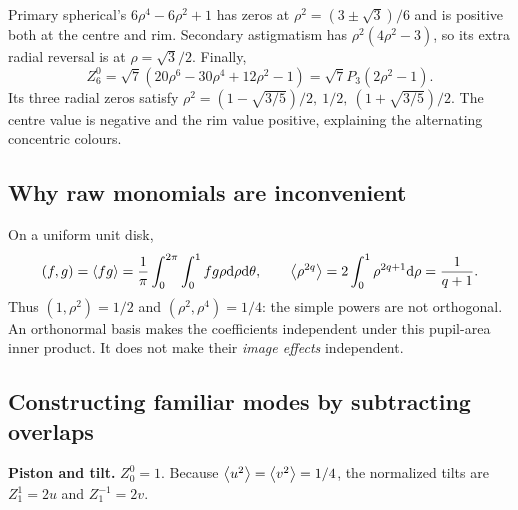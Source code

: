 Primary spherical's $6\rho^4-6\rho^2+1$ has zeros at
$\rho^2=(3\pm\sqrt3)/6$ and is positive both at the centre and rim. Secondary astigmatism has $\rho^2(4\rho^2-3)$, so its extra radial reversal is at $\rho=\sqrt3/2$. Finally,
\begin{equation}
Z_6^0=\sqrt7(20\rho^6-30\rho^4+12\rho^2-1)
=\sqrt7P_3(2\rho^2-1).
\end{equation}
Its three radial zeros satisfy $\rho^2=(1-\sqrt{3/5})/2,\ 1/2,\ (1+\sqrt{3/5})/2$. The centre value is negative and the rim value positive, explaining the alternating concentric colours.

\subsection{Why raw monomials are inconvenient}
On a uniform unit disk,
\begin{equation}
(f,g)=\left\langle fg\right\rangle=\frac1\pi\int_0^{2\pi}\int_0^1fg\rho\mathrm{d}\rho\mathrm{d}\theta,
\qquad \left\langle \rho^{2q}\right\rangle=2\int_0^1\rho^{2q+1}\mathrm{d}\rho=\frac1{q+1}.
\end{equation}
Thus $(1,\rho^2)=1/2$ and $(\rho^2,\rho^4)=1/4$: the simple powers are not orthogonal. An orthonormal basis makes the coefficients independent under this pupil-area inner product. It does not make their \emph{image effects} independent.

\subsection{Constructing familiar modes by subtracting overlaps}
\textbf{Piston and tilt.} $Z_0^0=1$. Because $\left\langle u^2\right\rangle=\left\langle v^2\right\rangle=1/4$, the normalized tilts are $Z_1^1=2u$ and $Z_1^{-1}=2v$.

